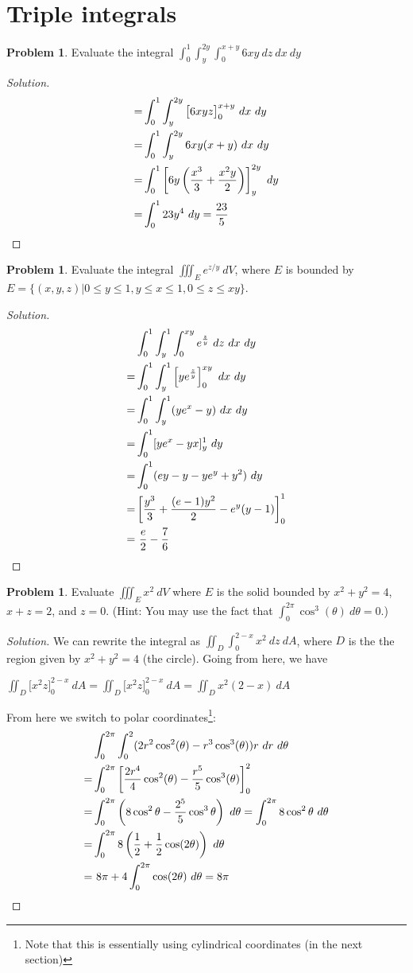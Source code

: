 \documentclass[12pt]{amsart}%
\theoremstyle{plain}
\theoremstyle{definition}
\newtheorem{prob}[theorem]{Problem}
\theoremstyle{special}
\newcommand{\sol}[1]{
{\begin{proof}[Solution]#1\end{proof}}
}
\newcommand{\Prob}[1]{\begin{tcolorbox}%
\begin{prob}
	#1
\end{prob}
\end{tcolorbox}	
}
\begin{document}
\section{Triple integrals}
\Prob{ Evaluate the integral $\displaystyle \int _0^1\int_y^{2y}\int_0^{x+y}6xy\ dz \ dx \ dy $}
\sol{
\begin{align*}
	=&\int _0^1\int_y^{2y}\big [ 6xyz\big ]_0^{x+y} \ dx \ dy\\=&\int _0^1\int_y^{2y}6xy(x+y) \ dx \ dy\\
	=&\int _0^1\left[6y\left( {x^3\over 3}+{x^2y\over 2}\right) \right]_y^{2y} \ dy\\
	=&\int _0^1 23y^4 \ dy= {23\over 5}
\end{align*}

}
\Prob{Evaluate the integral $\displaystyle\iiint_E e^{z/y}\ dV$, where $E$ is bounded by $E=\{(x,y,z)|0\leq y\leq 1,y\leq x\leq 1,0\leq z\leq xy\}$. }
\sol{
\begin{align*}
&\int_0^1 \int_y^1 \int _0^{xy}e^{z\over y}\ dz\ dx\ dy\\
=&\int_0^1\int_y^1\left[ye^{z\over y}\right]_0^{xy}\ dx\ dy\\
=&\int_0^1\int_y^1(ye^x-y)\ dx\ dy\\
=&\int_0^1 [ye^x-yx]_y^1\ dy\\
=&\int_0^1(ey-y-ye^y+y^2)\ dy\\
=&\left[ {y^3\over 3}+{(e-1)y^2\over 2}-e^y(y-1)\right]_0^1\\
=&\ {e\over 2}- {7\over 6}
\end{align*}

}
\Prob{Evaluate $\displaystyle \iiint_E x^2 \ d V$ where $E$ is the solid bounded by $x^2+y^2=4$, $x+z=2$, and $z=0$. (Hint: You may use the fact that $\int_{0}^{2\pi}\cos^3(\theta)\ d\theta=0$.)}
\sol{We can rewrite the integral as
\(\displaystyle \iint_D\int_{0}^{2-x}x^2\ dz\ dA \),
where $D$ is the the region given by $x^2+y^2=4$ (the circle). Going from here, we have

\centerline{\(\displaystyle\iint_D\big[{x^2z}\big]_0^{2-x}\ dA=\iint_D\big[{x^2z}\big]_0^{2-x}\ dA =\iint_Dx^2(2-x)\ dA\)}

From here we switch to polar coordinates\footnote{Note that this is essentially using cylindrical coordinates (in the next section)}:\begin{align*}&\int_0^{2\pi} \int_0^2 (2r^2\cos^2(\theta) -r^3\cos^3(\theta)) r \ dr\ d\theta
\\
=&\int_0^{2\pi}\left[{2r^4\over 4}\cos^2(\theta)-{r^5\over 5}\cos^3(\theta)\right]_0^2\\
=&\int_0^{2\pi}\left(8\cos^2\theta -{2^5\over 5}\cos^3\theta\right)\ d\theta =\int_0^{2\pi}8\cos^2\theta\ d\theta\\
=&\int_0^{2\pi}8\left({1\over 2}+{1\over 2}\cos(2\theta)\right)\ d\theta\\
=&\ 8\pi+4\int_0^{2\pi}\cos(2\theta)\ d\theta=8\pi\qedhere
\end{align*}
}
\end{document}
